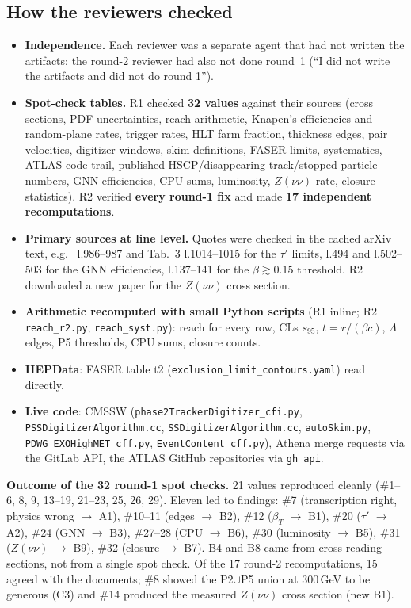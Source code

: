 \documentclass[11pt,a4paper]{article}
\begin{document}
\subsection{How the reviewers checked}
\begin{itemize}
\item \textbf{Independence.} Each reviewer was a separate agent that had not written the artifacts; the round-2 reviewer had also not done round~1 (``I did not write the artifacts and did not do round 1'').
\item \textbf{Spot-check tables.} R1 checked \textbf{32 values} against their sources (cross sections, PDF uncertainties, reach arithmetic, Knapen's efficiencies and random-plane rates, trigger rates, HLT farm fraction, thickness edges, pair velocities, digitizer windows, skim definitions, FASER limits, systematics, ATLAS code trail, published HSCP/disappearing-track/stopped-particle numbers, GNN efficiencies, CPU sums, luminosity, $Z(\nu\nu)$ rate, closure statistics). R2 verified \textbf{every round-1 fix} and made \textbf{17 independent recomputations}.
\item \textbf{Primary sources at line level.} Quotes were checked in the cached arXiv text, e.g.\ \cite{HSCP} l.986--987 and Tab.~3 l.1014--1015 for the $\tau'$ limits, \cite{Sha} l.494 and l.502--503 for the GNN efficiencies, \cite{L1DS} l.137--141 for the $\beta\gtrsim0.15$ threshold. R2 downloaded a new paper \cite{Zinv} for the $Z(\nu\nu)$ cross section.
\item \textbf{Arithmetic recomputed with small Python scripts} (R1 inline; R2 \texttt{reach\_r2.py}, \texttt{reach\_syst.py}): reach for every row, CLs $s_{95}$, $t=r/(\beta c)$, $\Lambda$ edges, P5 thresholds, CPU sums, closure counts.
\item \textbf{HEPData}: FASER table t2 (\texttt{exclusion\_limit\_contours.yaml}) read directly.
\item \textbf{Live code}: CMSSW (\texttt{phase2TrackerDigitizer\_cfi.py}, \texttt{PSSDigitizerAlgorithm.cc}, \texttt{SSDigitizerAlgorithm.cc}, \texttt{autoSkim.py}, \texttt{PDWG\_EXOHighMET\_cff.py}, \texttt{EventContent\_cff.py}), Athena merge requests via the GitLab API, the ATLAS GitHub repositories via \texttt{gh api}.
\end{itemize}

\textbf{Outcome of the 32 round-1 spot checks.} 21 values reproduced cleanly (\#1--6, 8, 9, 13--19, 21--23, 25, 26, 29). Eleven led to findings: \#7 (transcription right, physics wrong $\to$ A1), \#10--11 (edges $\to$ B2), \#12 ($\beta_T$ $\to$ B1), \#20 ($\tau'$ $\to$ A2), \#24 (GNN $\to$ B3), \#27--28 (CPU $\to$ B6), \#30 (luminosity $\to$ B5), \#31 ($Z(\nu\nu)$ $\to$ B9), \#32 (closure $\to$ B7). B4 and B8 came from cross-reading sections, not from a single spot check. Of the 17 round-2 recomputations, 15 agreed with the documents; \#8 showed the P2$\cup$P5 union at 300\,GeV to be generous (C3) and \#14 produced the measured $Z(\nu\nu)$ cross section (new B1).
\end{document}
